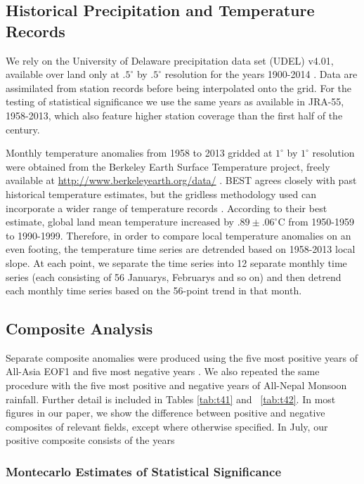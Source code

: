 \subsection{Historical Precipitation and Temperature Records}

	We rely on the University of Delaware precipitation data set (UDEL) v4.01, available over land only at $.5^{\circ}$ by $.5^{\circ}$ resolution for the years 1900-2014 \citep{Matsuura2015}. Data are assimilated from station records before being interpolated onto the grid. For the testing of statistical significance we use the same years as available in JRA-55, 1958-2013, which also feature higher station coverage than the first half of the  century.

	Monthly temperature anomalies from 1958 to 2013 gridded at $1^{\circ}$ by $1^{\circ}$ resolution were obtained from the Berkeley Earth Surface Temperature project, freely available at \url{http://www.berkeleyearth.org/data/} \citep{Rohde2012}. BEST agrees closely with past historical temperature estimates, but the gridless methodology used can incorporate a wider range of temperature records \citep{Rohde2013}. According to their best estimate, global land mean temperature increased by $.89 \pm .06^{\circ}$C from 1950-1959 to 1990-1999. Therefore, in order to compare local temperature anomalies on an even footing, the temperature time series are detrended based on 1958-2013 local slope. At each point, we separate the time series into 12 separate monthly time series (each consisting of 56 Januarys, Februarys and so on) and then detrend each monthly time series based on the 56-point trend in that month.
	
\subsection{Composite Analysis}		
	
	Separate composite anomalies were produced using the five most positive years of All-Asia EOF1 and five most negative years \citep{Day2015}. We also repeated the same procedure with the five most positive and negative years of All-Nepal Monsoon rainfall. Further detail is included in Tables \ref{tab:t41} and ~\ref{tab:t42}. In most figures in our paper, we show the difference between positive and negative composites of relevant fields, except where otherwise specified. In July, our positive composite consists of the years
	
\subsubsection{Montecarlo Estimates of Statistical Significance}	
	

